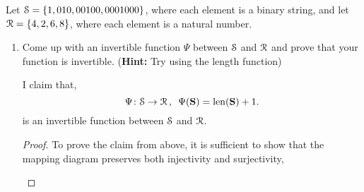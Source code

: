 \documentclass[12pt]{article} %
\begin{document}
\begin{qstn}
  Let $\EuScript{S} = \{1,010,00100,0001000\}$, where each element is a binary string, and let $\EuScript{R} =
  \{4,2,6,8\}$, where each element is a natural number.
  \begin{enumerate}[label=(\alph*)]
    \item Come up with an invertible function $\Psi$ between $\EuScript{S}$ and $\EuScript{R}$ and prove that your
      function is invertible. (\textbf{Hint:} Try using the length function)
      \begin{solution}
        I claim that,
        \[
            \Psi \colon \EuScript{S} \to \EuScript{R}\,,\,\,\, \Psi(\vb S) = \operatorname{len}(\vb S) + 1
        .\] is an invertible function between $\EuScript{S}$ and $\EuScript{R}$.
        \begin{proof}
          To prove the claim from above, it is sufficient to show that the mapping diagram preserves both
          injectivity and surjectivity,
          \begin{center}
\end{center}
\end{proof}
\end{solution}
\end{enumerate}
\end{qstn}
\end{document}
